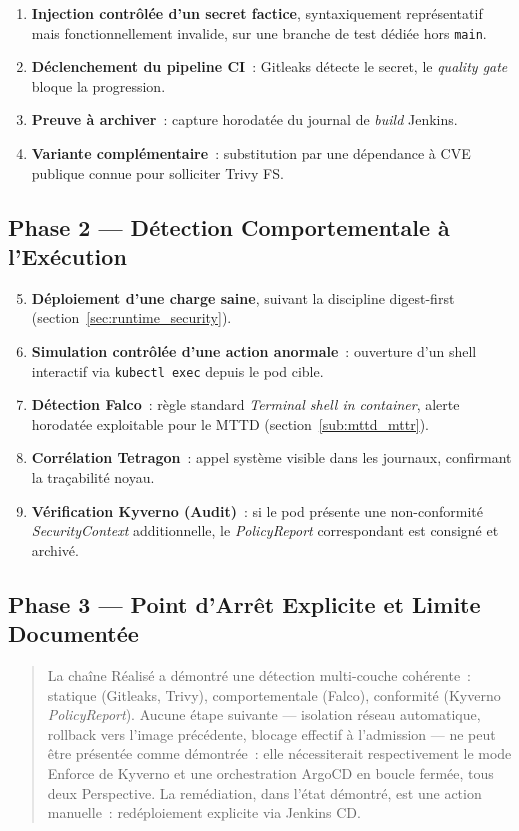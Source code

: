 \begin{enumerate}
    \item \textbf{Injection contrôlée d'un secret factice}, syntaxiquement représentatif mais fonctionnellement invalide, sur une branche de test dédiée hors \texttt{main}.
    \item \textbf{Déclenchement du pipeline CI}~: Gitleaks détecte le secret, le \textit{quality gate} bloque la progression.
    \item \textbf{Preuve à archiver}~: capture horodatée du journal de \textit{build} Jenkins.
    \item \textbf{Variante complémentaire}~: substitution par une dépendance à CVE publique connue pour solliciter Trivy FS.
\end{enumerate}

\subsection{Phase 2 — Détection Comportementale à l'Exécution}

\begin{enumerate}
    \setcounter{enumi}{4}
    \item \textbf{Déploiement d'une charge saine}, suivant la discipline digest-first (section~\ref{sec:runtime_security}).
    \item \textbf{Simulation contrôlée d'une action anormale}~: ouverture d'un shell interactif via \texttt{kubectl exec} depuis le pod cible.
    \item \textbf{Détection Falco}~: règle standard \textit{Terminal shell in container}, alerte horodatée exploitable pour le MTTD (section~\ref{sub:mttd_mttr}).
    \item \textbf{Corrélation Tetragon}~: appel système visible dans les journaux, confirmant la traçabilité noyau.
    \item \textbf{Vérification Kyverno (Audit)}~: si le pod présente une non-conformité \textit{SecurityContext} additionnelle, le \textit{PolicyReport} correspondant est consigné et archivé.
\end{enumerate}

\subsection{Phase 3 — Point d'Arrêt Explicite et Limite Documentée}

\begin{quote}
La chaîne Réalisé a démontré une détection multi-couche cohérente~: statique (Gitleaks, Trivy), comportementale (Falco), conformité (Kyverno \textit{PolicyReport}). Aucune étape suivante — isolation réseau automatique, rollback vers l'image précédente, blocage effectif à l'admission — ne peut être présentée comme démontrée~: elle nécessiterait respectivement le mode Enforce de Kyverno et une orchestration ArgoCD en boucle fermée, tous deux Perspective. La remédiation, dans l'état démontré, est une action manuelle~: redéploiement explicite via Jenkins CD.
\end{quote}

